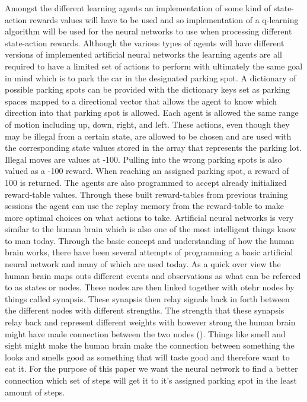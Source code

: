 \documentclass[letterpaper]{article}
\begin{document}
Amongst the different learning agents an implementation of some kind of state-action rewards values will have to be used and so implementation of a q-learning algorithm will be used for the neural networks to use when processing different state-action rewards.  Although the various types of agents will have different versions of implemented artificial neural networks the learning agents are all required to have a limited set of actions to perform with ultimately the same goal in mind which is to park the car in the designated parking spot. A dictionary of possible parking spots can be provided with the dictionary keys set as parking spaces mapped to a directional vector that allows the agent to know which direction into that parking spot is allowed.  Each agent is allowed the same range of motion including up, down, right, and left. These actions, even though they may be illegal from a certain state, are allowed to be chosen and are used with the corresponding state values stored in the array that represents the parking lot. Illegal moves are values at -100.  Pulling into the wrong parking spots is also valued as a -100 reward.  When reaching an assigned parking spot, a reward of 100 is returned. The agents are also programmed to accept already initialized reward-table values.  Through these built reward-tables from previous training sessions the agent can use the replay memory from the reward-table to make more optimal choices on what actions to take.  
\indent Artificial neural networks is very similar to the human brain which is also one of the most intelligent things know to man today.  Through the basic concept and understanding of how the human brain works, there have been several attempts of  programming a basic artificial neural network and many of which are used today.  As a quick over view the human brain maps outs different events and observations as what can be refereed to as states or nodes.  These nodes are then linked together with otehr nodes by things called synapsis.  These synapsis then relay signals back in forth between the different nodes with different strengths.  The strength that these synapsis relay back and represent different weights with however strong the human brain might have made connection between the two nodes (\cite{Silva}).  Things like smell and sight might make the human brain make the connection between something the looks and smells good as something that will taste good and therefore want to eat it. For the purpose of this paper we want the neural network to find a better connection which set of steps will get it to it's assigned parking spot in the least amount of steps.
 
\end{document}
